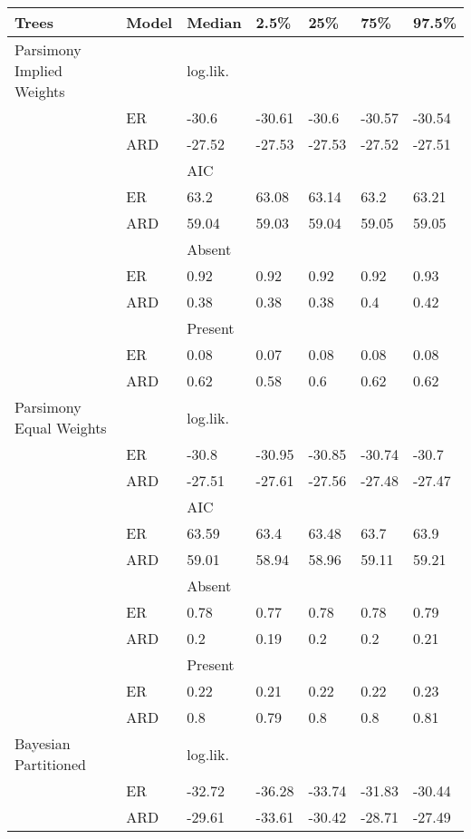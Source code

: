 
\begin{tabular}{l|l|l|l|l|l|l}
\hline
Trees & Model & Median & 2.5\% & 25\% & 75\% & 97.5\%\\
\hline
Parsimony Implied Weights &  & log.lik. &  &  &  & \\
\hline
 & ER & -30.6 & -30.61 & -30.6 & -30.57 & -30.54\\
\hline
 & ARD & -27.52 & -27.53 & -27.53 & -27.52 & -27.51\\
\hline
 &  & AIC &  &  &  & \\
\hline
 & ER & 63.2 & 63.08 & 63.14 & 63.2 & 63.21\\
\hline
 & ARD & 59.04 & 59.03 & 59.04 & 59.05 & 59.05\\
\hline
 &  & Absent &  &  &  & \\
\hline
 & ER & 0.92 & 0.92 & 0.92 & 0.92 & 0.93\\
\hline
 & ARD & 0.38 & 0.38 & 0.38 & 0.4 & 0.42\\
\hline
 &  & Present &  &  &  & \\
\hline
 & ER & 0.08 & 0.07 & 0.08 & 0.08 & 0.08\\
\hline
 & ARD & 0.62 & 0.58 & 0.6 & 0.62 & 0.62\\
\hline
Parsimony Equal Weights &  & log.lik. &  &  &  & \\
\hline
 & ER & -30.8 & -30.95 & -30.85 & -30.74 & -30.7\\
\hline
 & ARD & -27.51 & -27.61 & -27.56 & -27.48 & -27.47\\
\hline
 &  & AIC &  &  &  & \\
\hline
 & ER & 63.59 & 63.4 & 63.48 & 63.7 & 63.9\\
\hline
 & ARD & 59.01 & 58.94 & 58.96 & 59.11 & 59.21\\
\hline
 &  & Absent &  &  &  & \\
\hline
 & ER & 0.78 & 0.77 & 0.78 & 0.78 & 0.79\\
\hline
 & ARD & 0.2 & 0.19 & 0.2 & 0.2 & 0.21\\
\hline
 &  & Present &  &  &  & \\
\hline
 & ER & 0.22 & 0.21 & 0.22 & 0.22 & 0.23\\
\hline
 & ARD & 0.8 & 0.79 & 0.8 & 0.8 & 0.81\\
\hline
Bayesian Partitioned &  & log.lik. &  &  &  & \\
\hline
 & ER & -32.72 & -36.28 & -33.74 & -31.83 & -30.44\\
\hline
 & ARD & -29.61 & -33.61 & -30.42 & -28.71 & -27.49\\

\end{tabular}
